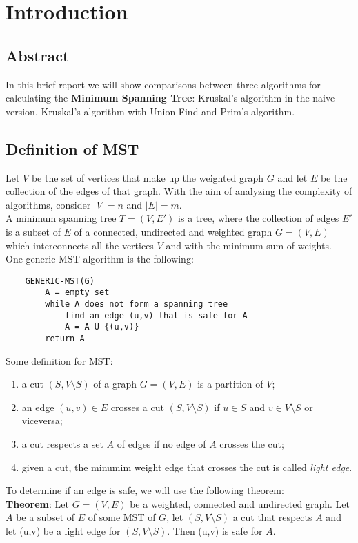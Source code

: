 \section{Introduction}


\subsection{Abstract}
In this brief report we will show comparisons between three algorithms for calculating the \textbf{Minimum Spanning Tree}: Kruskal's algorithm in the naive version, Kruskal's algorithm with Union-Find and Prim's algorithm.

\subsection{Definition of MST}
Let $V$ be the set of vertices that make up the weighted graph $G$ and let $E$ be the collection of the edges of that graph. With the aim of analyzing the complexity of algorithms, consider $|V| = n$ and $|E| = m$. \\
A minimum spanning tree $T = (V,E')$ is a tree, where the collection of edges $E'$ is a subset of $E$ of a connected, undirected and weighted graph $G = (V,E)$ which interconnects all the vertices $V$ and with the minimum sum of weights. \\
\noindent
One generic MST algorithm is the following: 
\begin{verbatim}
    GENERIC-MST(G)
        A = empty set
        while A does not form a spanning tree
            find an edge (u,v) that is safe for A
            A = A U {(u,v)}
        return A
\end{verbatim}
\noindent
Some definition for MST:
\begin{enumerate}
    \item a cut $(S, V \setminus S)$ of a graph $G = (V, E)$ is a partition of $V$;
    \item an edge $(u,v) \in E$ crosses a cut $(S, V \setminus S)$ if $u\in S$ and $v \in V \setminus S$ or viceversa;
    \item a cut respects a set $A$ of edges if no edge of $A$ crosses the cut;
    \item given a cut, the minumim weight edge that crosses the cut is called \textit{light edge}.
\end{enumerate}
\noindent
To determine if an edge is safe, we will use the following theorem: \\ \noindent
\textbf{Theorem}: Let $G = (V,E)$ be a weighted, connected and undirected graph. Let $A$ be a subset of $E$ of some MST of $G$, let $(S, V \setminus S)$ a cut that respects $A$ and let (u,v) be a light edge for $(S, V \setminus S)$. Then (u,v) is safe for $A$.